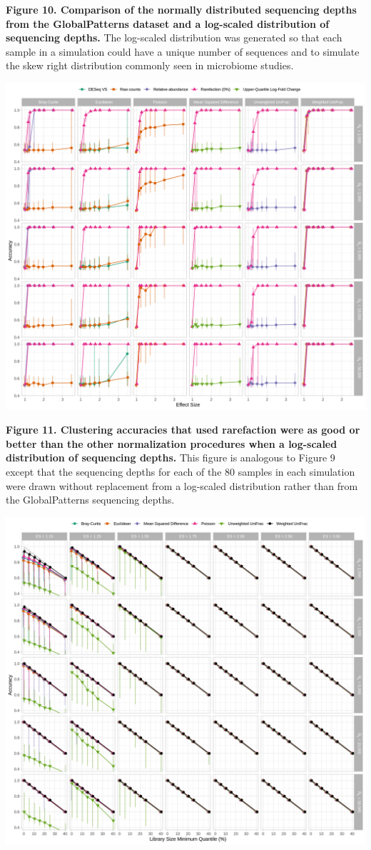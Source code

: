\documentclass[
]{article}
\begin{document}
\textbf{Figure 10. Comparison of the normally distributed sequencing
depths from the GlobalPatterns dataset and a log-scaled distribution of
sequencing depths.} The log-scaled distribution was generated so that
each sample in a simulation could have a unique number of sequences and
to simulate the skew right distribution commonly seen in microbiome
studies.

\newpage

\includegraphics{figure_11.png}

\textbf{Figure 11. Clustering accuracies that used rarefaction were as
good or better than the other normalization procedures when a log-scaled
distribution of sequencing depths.} This figure is analogous to Figure 9
except that the sequencing depths for each of the 80 samples in each
simulation were drawn without replacement from a log-scaled distribution
rather than from the GlobalPatterns sequencing depths.

\newpage

\includegraphics{figure_12.png}
\end{document}
